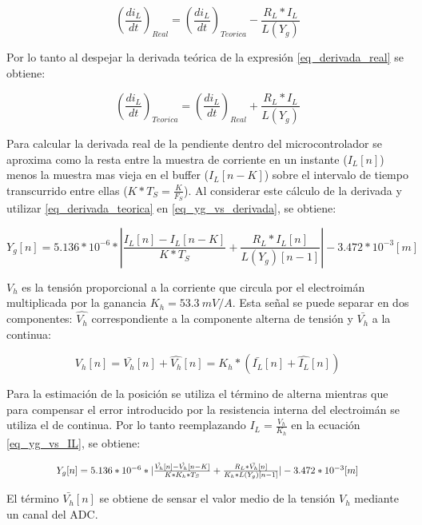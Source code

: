 \begin{equation} \label{eq_derivada_real}
	(\frac{di_L}{dt})_{Real}=(\frac{di_L}{dt})_{Teorica}-\frac{R_L*I_L}{L(Y_g)}
\end{equation}

Por lo tanto al despejar la derivada teórica de la expresión \ref{eq_derivada_real} se obtiene:

\begin{equation} \label{eq_derivada_teorica}
	(\frac{di_L}{dt})_{Teorica}=(\frac{di_L}{dt})_{Real}+\frac{R_L*I_L}{L(Y_g)}
\end{equation}


Para calcular la derivada real de la pendiente dentro del microcontrolador se aproxima como la resta entre la muestra de corriente en un instante ($I_L[n]$) menos la muestra mas vieja en el buffer ($I_L[n-K]$) sobre el intervalo de tiempo transcurrido entre ellas ($K*T_S=\frac{K}{F_S}$). Al considerar este cálculo de la derivada y utilizar \ref{eq_derivada_teorica} en \ref{eq_yg_vs_derivada}, se obtiene:

\begin{equation} \label{eq_yg_vs_IL}
	Y_g[n] = 5.136*10^{-6}* |\frac{I_L[n]-I_L[n-K]}{K*T_S}+\frac{R_L*I_L[n]}{L(Y_g)[n-1]}| - 3.472*10^{-3} [m]
\end{equation}

$V_h$ es la tensión proporcional a la corriente que circula por el electroimán multiplicada por la ganancia $K_h=53.3\:mV/A$. Esta señal se puede separar en dos componentes: $\hat{V_h}$  correspondiente a la componente alterna de tensión y $\bar{V_h}$ a la continua:


\begin{equation} 
	V_h[n] = \bar{V_h}[n] + \hat{V_h}[n] = K_h * (\bar{I_L}[n] + \hat{I_L}[n])
\end{equation}

 Para la estimación de la posición se utiliza el término de alterna mientras que para compensar el error introducido por la resistencia interna del electroimán se utiliza el de continua. Por lo tanto reemplazando $I_L=\frac{V_h}{K_h}$ en la ecuación \ref{eq_yg_vs_IL}, se obtiene:

\begin{equation}
	\resizebox{.8\hsize}{!}
	{
	$Y_g[n] = 5.136*10^{-6}*|\frac{\hat{V_h}[n]-\hat{V_h}[n-K]}{K*K_h*T_S} + \frac{R_L*\bar{V_h}[n]}{K_h*L(Y_g)[n-1]}|-3.472*10^{-3}[m]$
	}
\end{equation}

El término $\bar{V_h}[n]$ se obtiene de sensar el valor medio de la tensión $V_h$ mediante un canal del ADC.

